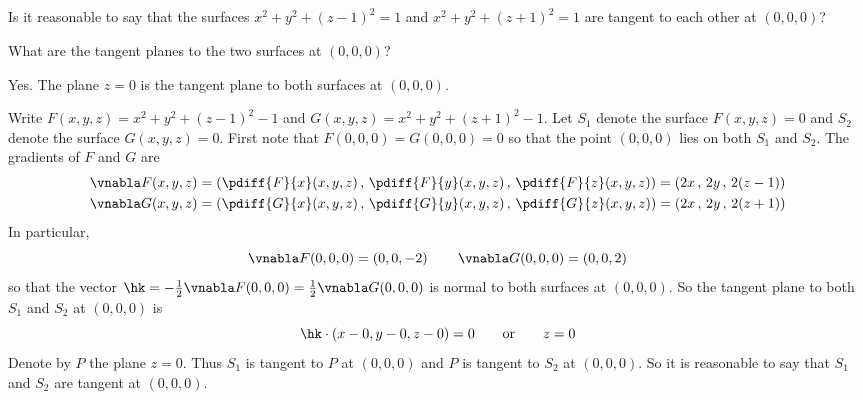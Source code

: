 \newcommand{\vt}{\mathbf{t}}
\newcommand{\vd}{\mathbf{d}}


\subsection*{\Conceptual}



\begin{question}
Is it reasonable to say that the surfaces $x^2+y^2+(z-1)^2=1$ and
$x^2+y^2+(z+1)^2=1$ are tangent to each other at $(0,0,0)$?
\end{question}

\begin{hint}
What are the tangent planes to the two surfaces at $(0,0,0)$?
\end{hint}

\begin{answer}
Yes. The plane $z=0$ is the tangent plane to both surfaces at $(0,0,0)$.
\end{answer}

\begin{solution}
Write $F(x,y,z) = x^2+y^2+(z-1)^2-1$ and $G(x,y,z) = x^2+y^2+(z+1)^2-1$.
Let $S_1$ denote the surface $F(x,y,z)=0$ and $S_2$ denote the surface 
$G(x,y,z)=0$.
First note that $F(0,0,0)=G(0,0,0)=0$ so that the point $(0,0,0)$ lies
on both $S_1$ and $S_2$. The gradients of $F$ and $G$ are 
\begin{align*}
\vnabla F(x,y,z)
  &=\left(\pdiff{F}{x}(x,y,z)\,,\,
        \pdiff{F}{y}(x,y,z)\,,\,
        \pdiff{F}{z}(x,y,z)\right) 
    =\left( 2x\,,\,2y\,,\,2(z-1)\right) \\
\vnabla G(x,y,z)
  &=\left(\pdiff{G}{x}(x,y,z)\,,\,
        \pdiff{G}{y}(x,y,z)\,,\,
        \pdiff{G}{z}(x,y,z)\right) 
    =\left( 2x\,,\,2y\,,\,2(z+1)\right) 
\end{align*}
In particular,
\begin{equation*}
\vnabla F(0,0,0)=\left( 0,0,-2\right)\qquad
\vnabla G(0,0,0)=\left( 0,0,2\right)
\end{equation*}
so that the vector $\hk=-\frac{1}{2}\vnabla F(0,0,0)
                       =\frac{1}{2}\vnabla G(0,0,0)$
is normal to both surfaces at $(0,0,0)$. So the tangent plane to 
both $S_1$ and $S_2$ at $(0,0,0)$ is
\begin{equation*}
\hk\cdot\left(x-0,y-0,z-0\right)=0\qquad\text{or}\qquad z=0
\end{equation*}
Denote by $P$ the plane $z=0$. 
Thus $S_1$ is tangent to $P$ at $(0,0,0)$ and $P$ is tangent to $S_2$ 
at $(0,0,0)$. So it is reasonable to say that $S_1$ and $S_2$ are tangent at
$(0,0,0)$.


\end{solution}


